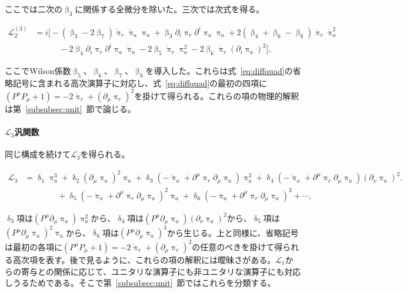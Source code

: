 \documentclass[a4paper,11pt]{ltjsarticle}
\numberwithin{equation}{section}
\newcommand{\Eq}[1]{Eq.~(\ref{#1})}
\newcommand{\Sec}[1]{Sec.~\ref{#1}}
\renewcommand{\Eq}[1]{式~\eqref{#1}}
\renewcommand{\Sec}[1]{第~\ref{#1}~節}
\begin{document}
ここでは二次の$\upbeta_3$に関係する全微分を除いた。三次では次式を得る。

\begin{align}\label{eq:cubicinter2}
\mathcal{L}_2^{(3)} &= i \Big[-(\upbeta_3 -2 \upbeta_7)\dot{\uppi}_{r} \dot{\uppi}_{a} \uppi_a + \upbeta_3 \partial_i \uppi_{r}  \partial^i \uppi_{a} \uppi_a +2 (\upbeta_4+\upbeta_6 - \upbeta_8) \dot{\uppi}_{r} \dot{\uppi}_a^2 \nonumber \\
& \qquad \quad - 2 \upbeta_4   \partial_i \uppi_{r}  \partial^i \uppi_{a} \dot{\uppi}_{a} - 2\upbeta_5 \dot{\uppi}_{r} \uppi_a^2  - 2 \upbeta_6 \dot{\uppi}_{r}(\partial_i\uppi_a)^2\Big],
\end{align}

ここでWilson係数$\upbeta_5$、$\upbeta_6$、$\upbeta_7$、$\upbeta_8$を導入した。これらは\Eq{eq:diffquad}の省略記号に含まれる高次演算子に対応し、\Eq{eq:diffquad}の最初の四項に$(P^\mu P_\mu+1)=-2\dot{\uppi}_r+(\partial_\mu\uppi_r)^2$を掛けて得られる。これらの項の物理的解釈は\Sec{subsubsec:unit}で論じる。

\paragraph{$\mathcal{L}_3$汎関数}

同じ構成を続けて$\mathcal{L}_3$を得られる。

\begin{align}
        \mathcal{L}_3 &= \updelta_1 \uppi_a^3 + \updelta_2 (\partial_\mu \uppi_a)^2 \uppi_a + \updelta_3 \left(-\dot{\uppi}_{a} + \partial^\mu \uppi_{r} \partial_\mu \uppi_{a}\right) \uppi_a^2 + \updelta_4 \left(-\dot{\uppi}_{a} + \partial^\mu \uppi_{r} \partial_\mu \uppi_{a}\right) (\partial_\nu \uppi_a)^2 \Big.  \nonumber\\
        &\qquad \qquad + \updelta_5 \left(-\dot{\uppi}_{a} + \partial^\mu \uppi_{r} \partial_\mu \uppi_{a}\right)^2 \uppi_a  + \updelta_6 \left(-\dot{\uppi}_{a} + \partial^\mu \uppi_{r} \partial_\mu \uppi_{a}\right)^3 + \cdots,
    \end{align}

$\updelta_3$項は$(P^\mu\partial_\mu\uppi_a)\uppi_a^2$から、$\updelta_4$項は$(P^\mu\partial_\mu\uppi_a)(\partial_\nu\uppi_a)^2$から、$\updelta_5$項は$(P^\mu\partial_\mu\uppi_a)^2\uppi_a$から、$\updelta_6$項は$(P^\mu\partial_\mu\uppi_a)^3$から生じる。上と同様に、省略記号は最初の各項に$(P^\mu P_\mu+1)=-2\dot{\uppi}_r+(\partial_\mu\uppi_r)^2$の任意のべきを掛けて得られる高次項を表す。後で見るように、これらの項の解釈には曖昧さがある。$\mathcal{L}_1$からの寄与との関係に応じて、ユニタリな演算子にも非ユニタリな演算子にも対応しうるためである。そこで\Sec{subsubsec:unit}ではこれらを分類する。
\end{document}
